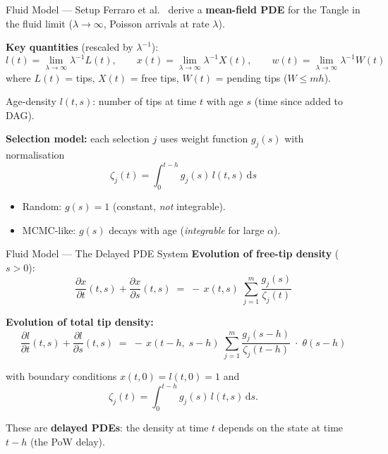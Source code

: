 \documentclass[aspectratio=169]{beamer}
\begin{document}
\begin{frame}{Fluid Model --- Setup}
  Ferraro et al.~\cite{ferraro2020} derive a \textbf{mean-field PDE} for the Tangle in the fluid limit ($\lambda\!\to\!\infty$, Poisson arrivals at rate $\lambda$).

  \bigskip
  \textbf{Key quantities} (rescaled by $\lambda^{-1}$):
  \[
    l(t) = \lim_{\lambda\to\infty} \lambda^{-1} L(t),
    \qquad
    x(t) = \lim_{\lambda\to\infty} \lambda^{-1} X(t),
    \qquad
    w(t) = \lim_{\lambda\to\infty} \lambda^{-1} W(t)
  \]
  where $L(t)$ = tips, $X(t)$ = free tips, $W(t)$ = pending tips ($W \le mh$).

  \bigskip
  Age-density $l(t,s)$: number of tips at time $t$ with age $s$ (time since added to DAG).

  \bigskip
  \textbf{Selection model:} each selection $j$ uses weight function $g_j(s)$ with normalisation
  \[
    \zeta_j(t) = \int_0^{t-h} g_j(s)\,l(t,s)\,\mathrm{d}s
  \]
  \begin{itemize}
    \item Random: $g(s)=1$ (constant, \emph{not} integrable).
    \item MCMC-like: $g(s)$ decays with age (\emph{integrable} for large $\alpha$).
  \end{itemize}
\end{frame}

\begin{frame}{Fluid Model --- The Delayed PDE System}
  \textbf{Evolution of free-tip density} ($s>0$):
  \[
    \boxed{
    \frac{\partial x}{\partial t}(t,s)
    + \frac{\partial x}{\partial s}(t,s)
    \;=\;
    -\,x(t,s)\;\sum_{j=1}^{m}\frac{g_j(s)}{\zeta_j(t)}
    }
  \]

  \textbf{Evolution of total tip density:}
  \[
    \boxed{
    \frac{\partial l}{\partial t}(t,s)
    + \frac{\partial l}{\partial s}(t,s)
    \;=\;
    -\,x(t\!-\!h,\;s\!-\!h)\;\sum_{j=1}^{m}\frac{g_j(s-h)}{\zeta_j(t-h)}
    \;\cdot\;\theta(s-h)
    }
  \]

  \medskip
  with boundary conditions $x(t,0)=l(t,0)=1$ and
  \[
    \zeta_j(t) = \int_0^{t-h} g_j(s)\,l(t,s)\,\mathrm{d}s.
  \]

  \medskip
  These are \textbf{delayed PDEs}: the density at time $t$ depends on the state at time $t-h$ (the PoW delay).
\end{frame}
\end{document}
